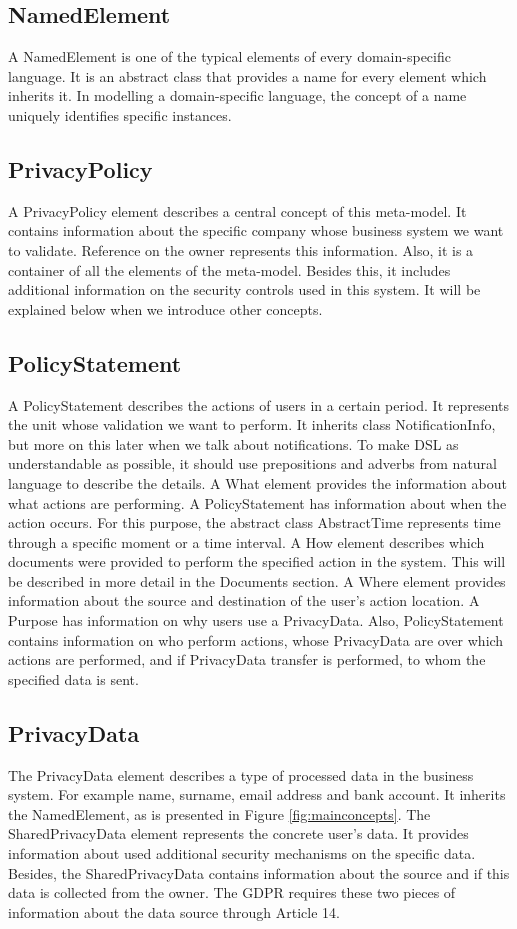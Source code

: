 \documentclass[11pt,english]{article}
\begin{document}
\subsection{NamedElement}
A NamedElement is one of the typical elements of every domain-specific language. It is an abstract class that provides a name for every element which inherits it. In modelling a domain-specific language, the concept of a name uniquely identifies specific instances.
\subsection{PrivacyPolicy}
A PrivacyPolicy element describes a central concept of this meta-model. It contains information about the specific company whose business system we want to validate. Reference on the owner represents this information. Also, it is a container of all the elements of the meta-model. Besides this, it includes additional information on the security controls used in this system. It will be explained below when we introduce other concepts.
\subsection{PolicyStatement}
A PolicyStatement describes the actions of users in a certain period. It represents the unit whose validation we want to perform. It inherits class NotificationInfo, but more on this later when we talk about notifications. To make DSL as understandable as possible, it should use prepositions and adverbs from natural language to describe the details. A What element provides the information about what actions are performing. A PolicyStatement has information about when the action occurs. For this purpose, the abstract class AbstractTime represents time through a specific moment or a time interval. A How element describes which documents were provided to perform the specified action in the system. This will be described in more detail in the Documents section. A Where element provides information about the source and destination of the user's action location. A Purpose has information on why users use a PrivacyData. Also, PolicyStatement contains information on who perform actions, whose PrivacyData are over which actions are performed, and if PrivacyData transfer is performed, to whom the specified data is sent.
\subsection{PrivacyData}
The PrivacyData element describes a type of processed data in the business system. For example name, surname, email address and bank account. It inherits the NamedElement, as is presented in Figure \ref{fig:mainconcepts}. The SharedPrivacyData element represents the concrete user's data. It provides information about used additional security mechanisms on the specific data. Besides, the SharedPrivacyData contains information about the source and if this data is collected from the owner. The GDPR requires these two pieces of information about the data source through Article 14.
\end{document}
